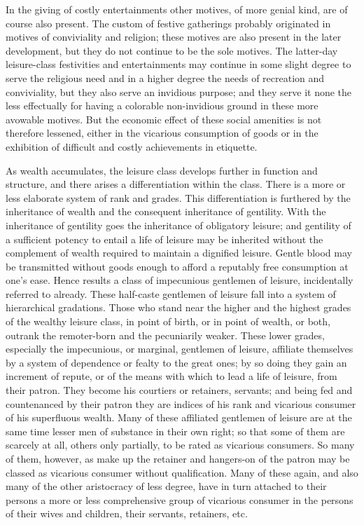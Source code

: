 \documentclass[12pt]{report}
\begin{document}
In the giving of costly entertainments other motives, of more genial
kind, are of course also present. The custom of festive gatherings
probably originated in motives of conviviality and religion; these
motives are also present in the later development, but they do
not continue to be the sole motives. The latter-day leisure-class
festivities and entertainments may continue in some slight degree to
serve the religious need and in a higher degree the needs of recreation
and conviviality, but they also serve an invidious purpose; and they
serve it none the less effectually for having a colorable non-invidious
ground in these more avowable motives. But the economic effect of these
social amenities is not therefore lessened, either in the vicarious
consumption of goods or in the exhibition of difficult and costly
achievements in etiquette.

As wealth accumulates, the leisure class develops further in function
and structure, and there arises a differentiation within the class.
There is a more or less elaborate system of rank and grades. This
differentiation is furthered by the inheritance of wealth and the
consequent inheritance of gentility. With the inheritance of gentility
goes the inheritance of obligatory leisure; and gentility of a
sufficient potency to entail a life of leisure may be inherited without
the complement of wealth required to maintain a dignified leisure.
Gentle blood may be transmitted without goods enough to afford a
reputably free consumption at one's ease. Hence results a class of
impecunious gentlemen of leisure, incidentally referred to already.
These half-caste gentlemen of leisure fall into a system of hierarchical
gradations. Those who stand near the higher and the highest grades of
the wealthy leisure class, in point of birth, or in point of wealth, or
both, outrank the remoter-born and the pecuniarily weaker. These lower
grades, especially the impecunious, or marginal, gentlemen of leisure,
affiliate themselves by a system of dependence or fealty to the great
ones; by so doing they gain an increment of repute, or of the means
with which to lead a life of leisure, from their patron. They become
his courtiers or retainers, servants; and being fed and countenanced by
their patron they are indices of his rank and vicarious consumer of his
superfluous wealth. Many of these affiliated gentlemen of leisure are at
the same time lesser men of substance in their own right; so that some
of them are scarcely at all, others only partially, to be rated as
vicarious consumers. So many of them, however, as make up the retainer
and hangers-on of the patron may be classed as vicarious consumer
without qualification. Many of these again, and also many of the other
aristocracy of less degree, have in turn attached to their persons a
more or less comprehensive group of vicarious consumer in the persons of
their wives and children, their servants, retainers, etc.
\end{document}
